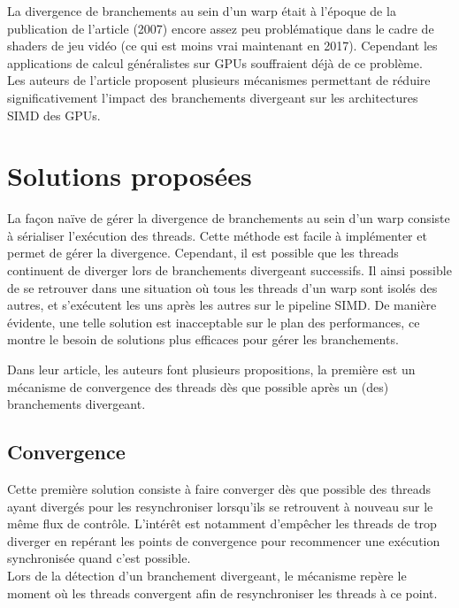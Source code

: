 \documentclass[11pt]{article}
\begin{document}
La divergence de branchements au sein d'un warp était à l'époque de la publication de l'article (2007) encore assez peu problématique dans le cadre de shaders de jeu vidéo (ce qui est moins vrai maintenant en 2017). Cependant les applications de calcul généralistes sur GPUs souffraient déjà de ce problème.
\\Les auteurs de l'article proposent plusieurs mécanismes permettant de réduire significativement l'impact des branchements divergeant sur les architectures SIMD des GPUs.


\section{Solutions proposées}

La façon naïve de gérer la divergence de branchements au sein d'un warp consiste à sérialiser l'exécution des threads.
Cette méthode est facile à implémenter et permet de gérer la divergence.
Cependant, il est possible que les threads continuent de diverger lors de branchements divergeant successifs. Il ainsi possible de se retrouver dans une situation où tous les threads d'un warp sont isolés des autres, et s'exécutent les uns après les autres sur le pipeline SIMD.
De manière évidente, une telle solution est inacceptable sur le plan des performances, ce montre le besoin de solutions plus efficaces pour gérer les branchements.

Dans leur article, les auteurs font plusieurs propositions, la première est un mécanisme de convergence des threads dès que possible après un (des) branchements divergeant.

\subsection{Convergence}

Cette première solution consiste à faire converger dès que possible des threads ayant divergés pour les resynchroniser lorsqu'ils se retrouvent à nouveau sur le même flux de contrôle.
L'intérêt est notamment d'empêcher les threads de trop diverger en repérant les points de convergence pour recommencer une exécution synchronisée quand c'est possible.
\\Lors de la détection d'un branchement divergeant, le mécanisme repère le moment où les threads convergent afin de resynchroniser les threads à ce point.
\end{document}
